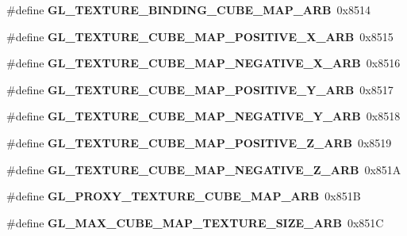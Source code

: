 \begin{DoxyCompactItemize}
\item 
\#define {\bfseries G\+L\+\_\+\+T\+E\+X\+T\+U\+R\+E\+\_\+\+B\+I\+N\+D\+I\+N\+G\+\_\+\+C\+U\+B\+E\+\_\+\+M\+A\+P\+\_\+\+A\+R\+B}~0x8514\label{_s_d_l__opengl_8h_ab746ba2030709d933ddd9355beceee85}

\item 
\#define {\bfseries G\+L\+\_\+\+T\+E\+X\+T\+U\+R\+E\+\_\+\+C\+U\+B\+E\+\_\+\+M\+A\+P\+\_\+\+P\+O\+S\+I\+T\+I\+V\+E\+\_\+\+X\+\_\+\+A\+R\+B}~0x8515\label{_s_d_l__opengl_8h_a4504ef42f9abf044ed41c11d8d20bdbe}

\item 
\#define {\bfseries G\+L\+\_\+\+T\+E\+X\+T\+U\+R\+E\+\_\+\+C\+U\+B\+E\+\_\+\+M\+A\+P\+\_\+\+N\+E\+G\+A\+T\+I\+V\+E\+\_\+\+X\+\_\+\+A\+R\+B}~0x8516\label{_s_d_l__opengl_8h_aea7d57e726bd12de57be89bd9575b7ac}

\item 
\#define {\bfseries G\+L\+\_\+\+T\+E\+X\+T\+U\+R\+E\+\_\+\+C\+U\+B\+E\+\_\+\+M\+A\+P\+\_\+\+P\+O\+S\+I\+T\+I\+V\+E\+\_\+\+Y\+\_\+\+A\+R\+B}~0x8517\label{_s_d_l__opengl_8h_a4d5ef0ad5b048658cb396166032353ff}

\item 
\#define {\bfseries G\+L\+\_\+\+T\+E\+X\+T\+U\+R\+E\+\_\+\+C\+U\+B\+E\+\_\+\+M\+A\+P\+\_\+\+N\+E\+G\+A\+T\+I\+V\+E\+\_\+\+Y\+\_\+\+A\+R\+B}~0x8518\label{_s_d_l__opengl_8h_a60e8313711816e9c58e1110f4228f065}

\item 
\#define {\bfseries G\+L\+\_\+\+T\+E\+X\+T\+U\+R\+E\+\_\+\+C\+U\+B\+E\+\_\+\+M\+A\+P\+\_\+\+P\+O\+S\+I\+T\+I\+V\+E\+\_\+\+Z\+\_\+\+A\+R\+B}~0x8519\label{_s_d_l__opengl_8h_a756d409a09859664cd9276a7fd7eb628}

\item 
\#define {\bfseries G\+L\+\_\+\+T\+E\+X\+T\+U\+R\+E\+\_\+\+C\+U\+B\+E\+\_\+\+M\+A\+P\+\_\+\+N\+E\+G\+A\+T\+I\+V\+E\+\_\+\+Z\+\_\+\+A\+R\+B}~0x851\+A\label{_s_d_l__opengl_8h_a0f227ccd59d9649e1c2b51478ed296fc}

\item 
\#define {\bfseries G\+L\+\_\+\+P\+R\+O\+X\+Y\+\_\+\+T\+E\+X\+T\+U\+R\+E\+\_\+\+C\+U\+B\+E\+\_\+\+M\+A\+P\+\_\+\+A\+R\+B}~0x851\+B\label{_s_d_l__opengl_8h_ace2cdd0728b7d0385270b8e39fbc92ec}

\item 
\#define {\bfseries G\+L\+\_\+\+M\+A\+X\+\_\+\+C\+U\+B\+E\+\_\+\+M\+A\+P\+\_\+\+T\+E\+X\+T\+U\+R\+E\+\_\+\+S\+I\+Z\+E\+\_\+\+A\+R\+B}~0x851\+C\label{_s_d_l__opengl_8h_aeec2093a9470d87086ac25aaeb5c8b91}


\end{DoxyCompactItemize}
